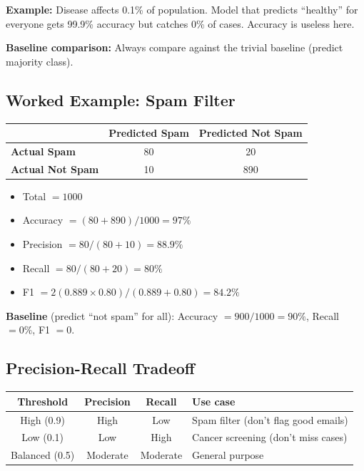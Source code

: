 \documentclass[11pt,a4paper]{article}
\begin{document}
\textbf{Example:} Disease affects 0.1\% of population. Model that predicts ``healthy'' for everyone gets 99.9\% accuracy but catches 0\% of cases. Accuracy is useless here.

\textbf{Baseline comparison:} Always compare against the trivial baseline (predict majority class).

\subsection{Worked Example: Spam Filter}

\begin{center}
\begin{tabular}{|l|c|c|}
\hline
 & \textbf{Predicted Spam} & \textbf{Predicted Not Spam} \\
\hline
\textbf{Actual Spam} & 80 & 20 \\
\textbf{Actual Not Spam} & 10 & 890 \\
\hline
\end{tabular}
\end{center}

\begin{itemize}
    \item Total $= 1000$
    \item Accuracy $= (80 + 890)/1000 = 97\%$
    \item Precision $= 80/(80+10) = 88.9\%$
    \item Recall $= 80/(80+20) = 80\%$
    \item F1 $= 2(0.889 \times 0.80)/(0.889 + 0.80) = 84.2\%$
\end{itemize}

\textbf{Baseline} (predict ``not spam'' for all): Accuracy $= 900/1000 = 90\%$, Recall $= 0\%$, F1 $= 0$.

\subsection{Precision-Recall Tradeoff}

\begin{center}
\begin{tabular}{|c|c|c|l|}
\hline
\textbf{Threshold} & \textbf{Precision} & \textbf{Recall} & \textbf{Use case} \\
\hline
High (0.9) & High & Low & Spam filter (don't flag good emails) \\
Low (0.1) & Low & High & Cancer screening (don't miss cases) \\
Balanced (0.5) & Moderate & Moderate & General purpose \\
\hline
\end{tabular}
\end{center}
\end{document}
